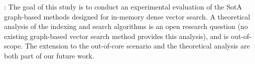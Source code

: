 : The goal of this study is to conduct an experimental evaluation of the SotA graph-based methods designed for in-memory dense vector search. A theoretical analysis of the indexing and search algorithms is an open research question (no existing graph-based vector search method provides this analysis), and is out-of-scope. The extension to the out-of-core scenario and the theoretical analysis are both part of our future work. 
